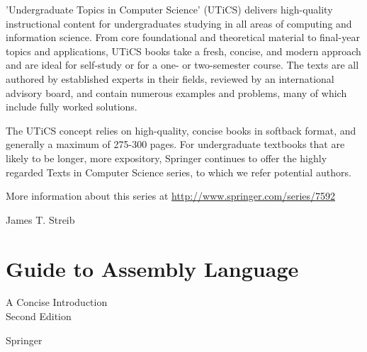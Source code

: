 \documentclass[10pt]{book}
\begin{document}
'Undergraduate Topics in Computer Science' (UTiCS) delivers high-quality instructional content for undergraduates studying in all areas of computing and information science. From core foundational and theoretical material to final-year topics and applications, UTiCS books take a fresh, concise, and modern approach and are ideal for self-study or for a one- or two-semester course. The texts are all authored by established experts in their fields, reviewed by an international advisory board, and contain numerous examples and problems, many of which include fully worked solutions.

The UTiCS concept relies on high-quality, concise books in softback format, and generally a maximum of 275-300 pages. For undergraduate textbooks that are likely to be longer, more expository, Springer continues to offer the highly regarded Texts in Computer Science series, to which we refer potential authors.

More information about this series at \href{http://www.springer.com/series/7592}{http://www.springer.com/series/7592}


James T. Streib

\section*{Guide to Assembly Language }
A Concise Introduction\\
Second Edition

Springer
\end{document}

